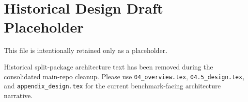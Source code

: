\section{Historical Design Draft Placeholder}
\label{sec:design_details_old}

This file is intentionally retained only as a placeholder.

Historical split-package architecture text has been removed during the consolidated main-repo cleanup.
Please use \texttt{04\_overview.tex}, \texttt{04.5\_design.tex}, and \texttt{appendix\_design.tex} for the current benchmark-facing architecture narrative.
